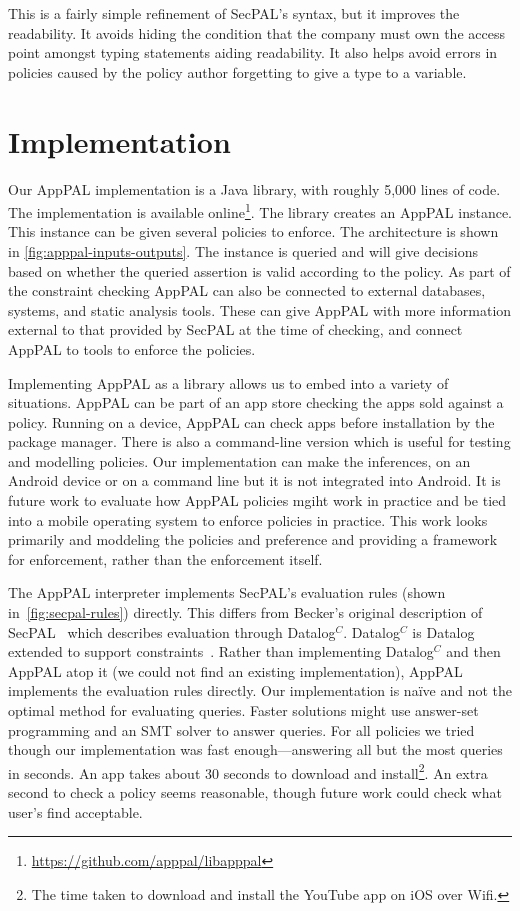 \documentclass[thesis.tex]{subfiles}
\begin{document}
This is a fairly simple refinement of SecPAL's syntax, but it improves the
readability. It avoids hiding the condition that the company must own the access
point amongst typing statements aiding readability. It also helps avoid errors
in policies caused by the policy author forgetting to give a type to a variable.

\section{Implementation}
\label{sec:implementation}

Our AppPAL implementation is a Java library, with roughly 5,000 lines of code.
The implementation is available online\footnote{\url{https://github.com/apppal/libapppal}}.
The library creates an AppPAL instance.
This instance can be given several policies to enforce. 
The architecture is shown in \autoref{fig:apppal-inputs-outputs}.
The instance is queried and will give decisions based on whether the queried assertion is valid according to the policy.
As part of the constraint checking AppPAL can also be connected to external databases, systems, and static analysis tools.
These can give AppPAL with more information external to that provided by SecPAL at the time of checking, and connect AppPAL to tools to enforce the policies.

Implementing AppPAL as a library allows us to embed into a variety of
situations.  AppPAL can be part of an app store checking the apps sold against
a policy.  Running on a device, AppPAL can check apps before installation by
the package manager.  There is also a command-line version which is useful for
testing and modelling policies.  Our implementation can make the inferences, on
an Android device or on a command line but it is not integrated into Android.
It is future work to evaluate how AppPAL policies mgiht work in practice and be
tied into a mobile operating system to enforce policies in practice.  This work
looks primarily and moddeling the policies and preference and providing a
framework for enforcement, rather than the enforcement itself.

The AppPAL interpreter implements SecPAL's evaluation rules (shown in~\autoref{fig:secpal-rules}) directly.
This differs from Becker's original description of SecPAL~\cite{becker_secpal:_2010} which describes evaluation through Datalog$^C$.
Datalog$^C$ is Datalog extended to support constraints~\cite{li_datalog_2003}.
Rather than implementing Datalog$^C$ and then AppPAL atop it (we could not find an existing implementation), AppPAL implements the evaluation rules directly.
Our implementation is na\"ive and not the optimal method for evaluating queries.
Faster solutions might use answer-set programming and an SMT solver to answer queries.
For all policies we tried though our implementation was fast enough---answering all but the most queries in seconds.  An app takes about 30 seconds to download and install\footnote{The time taken to download and install the YouTube app on iOS over Wifi.}. An extra second to check a policy seems reasonable, though future work could check what user's find acceptable.
\end{document}
